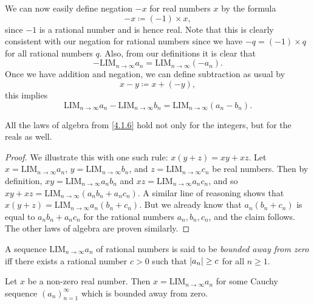 \begin{note}
  We can now easily define negation \(-x\) for real numbers \(x\) by the formula
  \[
    -x \coloneqq (-1) \times x,
  \]
  since \(-1\) is a rational number and is hence real.
  Note that this is clearly consistent with our negation for rational numbers since we have \(-q = (-1) \times q\) for all rational numbers \(q\).
  Also, from our definitions it is clear that
  \[
    -\text{LIM}_{n \to \infty} a_n = \text{LIM}_{n \to \infty} (-a_n).
  \]
  Once we have addition and negation, we can define subtraction as usual by
  \[
    x - y \coloneqq x + (-y),
  \]
  this implies
  \[
    \text{LIM}_{n \to \infty} a_n - \text{LIM}_{n \to \infty} b_n = \text{LIM}_{n \to \infty} (a_n - b_n).
  \]
\end{note}

\begin{prop}\label{5.3.11}
  All the laws of algebra from \cref{4.1.6} hold not only for the integers, but for the reals as well.
\end{prop}

\begin{proof}
  We illustrate this with one such rule: \(x(y + z) = xy + xz\).
  Let \(x = \text{LIM}_{n \to \infty} a_n\), \(y = \text{LIM}_{n \to \infty} b_n\), and \(z = \text{LIM}_{n \to \infty} c_n\) be real numbers.
  Then by definition, \(xy = \text{LIM}_{n \to \infty} a_n b_n\) and \(xz = \text{LIM}_{n \to \infty} a_n c_n\), and so \(xy + xz = \text{LIM}_{n \to \infty} (a_n b_n + a_n c_n)\).
  A similar line of reasoning shows that \(x(y + z) = \text{LIM}_{n \to \infty} a_n (b_n + c_n)\).
  But we already know that \(a_n (b_n + c_n)\) is equal to \(a_n b_n + a_n c_n\) for the rational numbers \(a_n, b_n, c_n\), and the claim follows.
  The other laws of algebra are proven similarly.
\end{proof}

\begin{defn}\label{5.3.12}
  A sequence \(\text{LIM}_{n \to \infty} a_n\) of rational numbers is said to be \emph{bounded away from zero} iff there exists a rational number \(c > 0\) such that \(\left\lvert a_n\right\rvert \geq c\) for all \(n \geq 1\).
\end{defn}

\setcounter{thm}{13}
\begin{lem}\label{5.3.14}
  Let \(x\) be a non-zero real number.
  Then \(x = \text{LIM}_{n \to \infty} a_n\) for some Cauchy sequence \((a_n)_{n = 1}^{\infty}\) which is bounded away from zero.
\end{lem}

